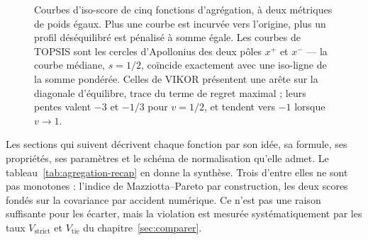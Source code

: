 \documentclass[11pt,a4paper]{article}
\theoremstyle{definition}
\theoremstyle{remark}
\begin{document}
\begin{figure}[htbp]
\vspace{0.6em}
\caption{Courbes d'iso-score de cinq fonctions d'agrégation, à deux métriques de poids
égaux. Plus une courbe est incurvée vers l'origine, plus un profil déséquilibré est
pénalisé à somme égale. Les courbes de TOPSIS sont les cercles d'Apollonius des deux
pôles $x^{+}$ et $x^{-}$ --- la courbe médiane, $s = 1/2$, coïncide exactement avec une
iso-ligne de la somme pondérée. Celles de VIKOR présentent une arête sur la diagonale
d'équilibre, trace du terme de regret maximal ; leurs pentes valent $-3$ et $-1/3$ pour
$v = 1/2$, et tendent vers $-1$ lorsque $v \to 1$.}
\label{fig:isoscores}
\end{figure}

\bigskip

Les sections qui suivent décrivent chaque fonction par son idée, sa formule, ses
propriétés, ses paramètres et le schéma de normalisation qu'elle admet. Le
tableau~\ref{tab:agregation-recap} en donne la synthèse. Trois d'entre elles ne sont pas
monotones : l'indice de Mazziotta--Pareto par construction, les deux scores fondés sur la
covariance par accident numérique. Ce n'est pas une raison suffisante pour les écarter,
mais la violation est mesurée systématiquement par les taux $V_{\mathrm{strict}}$ et
$V_{\mathrm{tie}}$ du chapitre~\ref{sec:comparer}.

\bigskip
\end{document}
